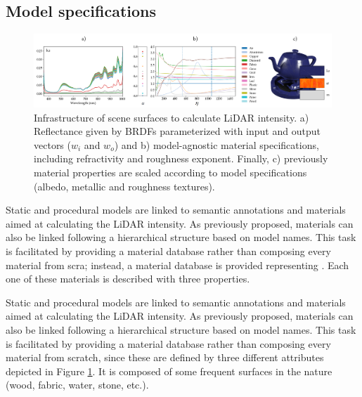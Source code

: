 \subsection{Model specifications}

\begin{figure}
    \centering
    \includegraphics[width=\linewidth]{figs/lidar_intensity/brdf_properties.png}
	\caption{Infrastructure of scene surfaces to calculate LiDAR intensity. a) Reflectance given by BRDFs parameterized with input and output vectors ($w_i$ and $w_o$) \cite{dupuy_adaptive_2018} and b) model-agnostic material specifications, including refractivity and roughness exponent. Finally, c) previously material properties are scaled according to model specifications (albedo, metallic and roughness textures). }
	\label{fig:lidar_brdf_properties}
\end{figure}

Static and procedural models are linked to semantic annotations and materials aimed at calculating the LiDAR intensity. As previously proposed, materials can also be linked following a hierarchical structure based on model names. This task is facilitated by providing a material database rather than composing every material from scra; instead, a material database is provided representing . Each one of these materials is described with three properties.

Static and procedural models are linked to semantic annotations and materials aimed at calculating the LiDAR intensity. As previously proposed, materials can also be linked following a hierarchical structure based on model names. This task is facilitated by providing a material database rather than composing every material from scratch, since these are defined by three different attributes depicted in Figure \ref{fig:lidar_brdf_properties}. It is composed of some frequent surfaces in the nature (wood, fabric, water, stone, etc.).

